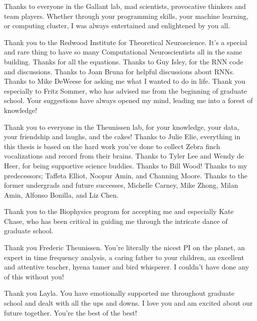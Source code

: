 \documentclass{ucbthesis}
\begin{document}
\begin{frontmatter}
\begin{acknowledgements}
Thanks to everyone in the Gallant lab, mad scientists, provocative thinkers and team players. Whether through your programming skills, your machine learning, or computing cluster, I was always entertained and enlightened by you all.

Thank you to the Redwood Institute for Theoretical Neuroscience. It's a special and rare thing to have so many Computational Neuroscientists all in the same building. Thanks for all the equations. Thanks to Guy Isley, for the RNN code and discussions. Thanks to Joan Bruna for helpful discussions about RNNs. Thanks to Mike DeWeese for asking me what I wanted to do in life. Thank you especially to Fritz Sommer, who has advised me from the beginning of graduate school. Your suggestions have always opened my mind, leading me into a forest of knowledge!

Thank you to everyone in the Theunissen lab, for your knowledge, your data, your friendship and laughs, and the cakes! Thanks to Julie Elie, everything in this thesis is based on the hard work you've done to collect Zebra finch vocalizations and record from their brains. Thanks to Tyler Lee and Wendy de Heer, for being supportive science buddies. Thanks to Bill Wood! Thanks to my predecessors; Taffeta Elliot, Noopur Amin, and Channing Moore. Thanks to the former undergrads and future successes, Michelle Carney, Mike Zhong, Milan Amin, Alfonso Bonilla, and Liz Chen.

Thank you to the Biophysics program for accepting me and especially Kate Chase, who has been critical in guiding me through the intricate dance of graduate school.

Thank you Frederic Theunissen. You're literally the nicest PI on the planet, an expert in time frequency analysis, a caring father to your children, an excellent and attentive teacher, hyena tamer and bird whisperer. I couldn't have done any of this without you!

Thank you Layla. You have emotionally supported me throughout graduate school and dealt with all the ups and downs. I love you and am excited about our future together. You're the best of the best!

\end{acknowledgements}


\tableofcontents
\clearpage
\listoffigures
\clearpage
\listoftables

\end{frontmatter}

\pagestyle{headings}






\printbibliography
\end{document}
